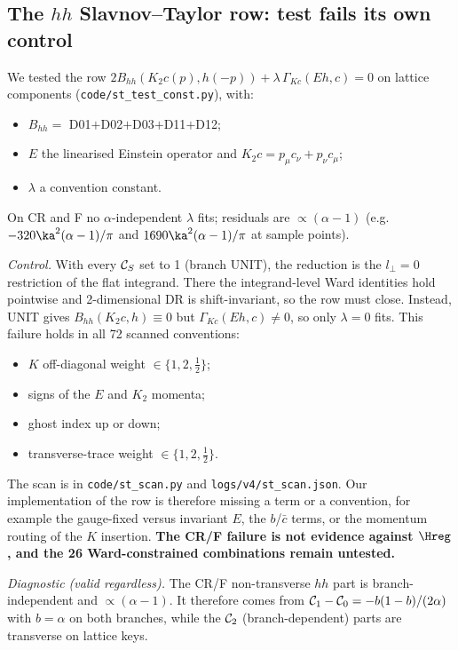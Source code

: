 \subsection{The $hh$ Slavnov--Taylor row: test fails its own control}\label{sec:st}
We tested the row $2B_{hh}(K_2c(p),h(-p))+\lambda\,\Gamma_{Kc}(Eh,c)=0$ on lattice components (\texttt{code/st\_test\_const.py}), with:
\begin{itemize}
\item $B_{hh}=$ D01$+$D02$+$D03$+$D11$+$D12;
\item $E$ the linearised Einstein operator and $K_2c=p_\mu c_\nu+p_\nu c_\mu$;
\item $\lambda$ a convention constant.
\end{itemize}
On CR and F no $\alpha$-independent $\lambda$ fits; residuals are $\propto(\alpha-1)$ (e.g.\ $-320\ka^2(\alpha-1)/\pi$ and $1690\ka^2(\alpha-1)/\pi$ at sample points).

\emph{Control.} With every $\mathcal C_S$ set to 1 (branch UNIT), the reduction is the $l_\perp=0$ restriction of the flat integrand. There the integrand-level Ward identities hold pointwise and 2-dimensional DR is shift-invariant, so the row must close. Instead, UNIT gives $B_{hh}(K_2c,h)\equiv0$ but $\Gamma_{Kc}(Eh,c)\neq0$, so only $\lambda=0$ fits. This failure holds in all 72 scanned conventions:
\begin{itemize}
\item $K$ off-diagonal weight $\in\{1,2,\frac12\}$;
\item signs of the $E$ and $K_2$ momenta;
\item ghost index up or down;
\item transverse-trace weight $\in\{1,2,\frac12\}$.
\end{itemize}
The scan is in \texttt{code/st\_scan.py} and \texttt{logs/v4/st\_scan.json}. Our implementation of the row is therefore missing a term or a convention, for example the gauge-fixed versus invariant $E$, the $b$/$\bar c$ terms, or the momentum routing of the $K$ insertion. \textbf{The CR/F failure is not evidence against $\Hreg$, and the 26 Ward-constrained combinations remain untested.}

\emph{Diagnostic (valid regardless).} The CR/F non-transverse $hh$ part is branch-independent and $\propto(\alpha-1)$. It therefore comes from $\mathcal C_1-\mathcal C_0=-b(1-b)/(2\alpha)$ with $b=\alpha$ on both branches, while the $\mathcal C_2$ (branch-dependent) parts are transverse on lattice keys.

